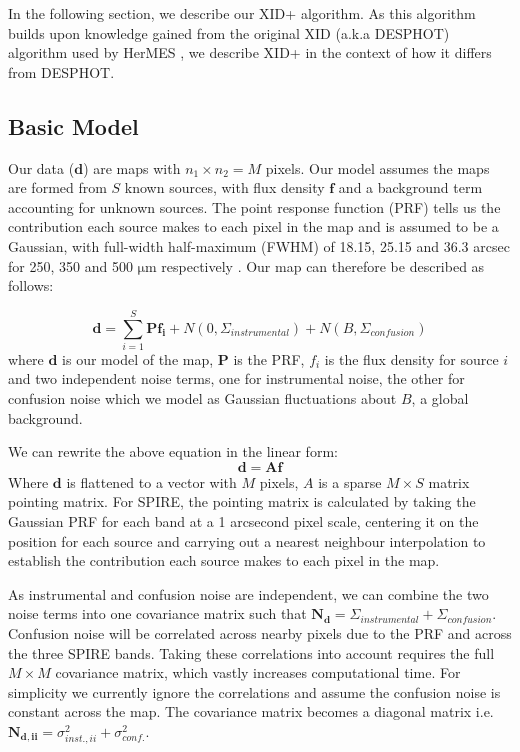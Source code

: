 \documentclass[useAMS,usenatbib]{mnras}
\begin{document}
In the following section, we describe our \textsc{XID+} algorithm. As this algorithm builds upon knowledge gained from the original XID (a.k.a \textsc{DESPHOT}) algorithm used by HerMES \citep{Roseboom:2010, Roseboom:2011, Wang:2014}, we describe XID+ in the context of how it differs from \textsc{DESPHOT}. 


\subsection{Basic Model}
Our data ($\mathbf{d}$) are maps with $n_1 \times n_2 = M$ pixels. Our model assumes the maps are formed from $S$ known sources, with flux density $\mathbf{f}$ and a background term accounting for unknown sources. The point response function (PRF) tells us the contribution each source makes to each pixel in the map and is assumed to be a Gaussian, with full-width half-maximum (FWHM) of 18.15, 25.15 and 36.3 arcsec for 250, 350 and 500 $\mathrm{\mu m}$ respectively \citep{Griffin:2010}. Our map can therefore be described as follows:

\begin{equation}
\mathbf{d} = \sum\limits_{i=1}^S \mathbf{P f_i} + N(0,\Sigma_{instrumental}) + N(B,\Sigma_{confusion})
\label{eq:map}
\end{equation}
where $\mathbf{d}$ is our model of the map, $\mathbf{P}$ is the PRF, $f_i$ is the flux density for source $i$ and two independent noise terms, one for instrumental noise, the other for confusion noise which we model as Gaussian fluctuations about $B$, a global background.

We can rewrite the above equation in the linear form:
\begin{equation}
\mathbf{d} = \mathbf{Af}
\label{eq:map2}
\end{equation}
Where $\mathbf{d}$ is flattened to a vector with $M$ pixels, $A$ is a sparse $M \times S$ matrix pointing matrix. For SPIRE, the pointing matrix is calculated by taking the Gaussian PRF for each band at a 1 arcsecond pixel scale, centering it on the position for each source and carrying out a nearest neighbour interpolation to establish the contribution each source makes to each pixel in the map.

As instrumental and confusion noise are independent, we can combine the two noise terms into one covariance matrix such that $\mathbf{N_d} = \Sigma_{instrumental}+\Sigma_{confusion}$. Confusion noise will be correlated across nearby pixels due to the PRF and across the three SPIRE bands. Taking these correlations into account requires the full $M \times M$ covariance matrix, which vastly increases computational time. For simplicity we currently ignore the correlations and assume the confusion noise is constant across the map. The covariance matrix becomes a diagonal matrix i.e. $\mathbf{N_{d,ii}} =\sigma_{inst.,ii}^2+\sigma_{conf.}^2$. 
\end{document}
